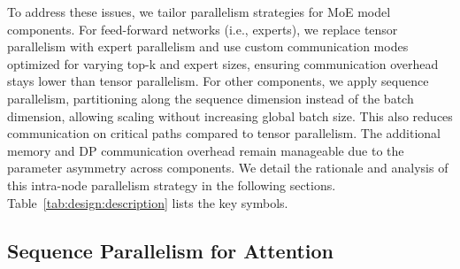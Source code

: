 To address these issues, we tailor parallelism strategies for MoE model components. For feed-forward networks (i.e., experts), we replace tensor parallelism with expert parallelism and use custom communication modes optimized for varying top-k and expert sizes, ensuring communication overhead stays lower than tensor parallelism. For other components, we apply sequence parallelism, partitioning along the sequence dimension instead of the batch dimension, allowing scaling without increasing global batch size. This also reduces communication on critical paths compared to tensor parallelism. The additional memory and DP communication overhead remain manageable due to the parameter asymmetry across components. We detail the rationale and analysis of this intra-node parallelism strategy in the following sections. Table~\ref{tab:design:description} lists the key symbols.


\subsection{Sequence Parallelism for Attention}
\label{sec:design:parallelism:sp_attention}

